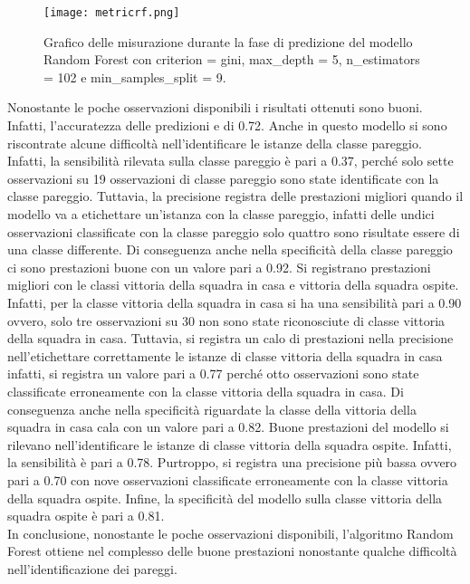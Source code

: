 \begin{figure}[]
	\begin{center}
		\texttt{[image: metricrf.png]}
		\caption{Grafico delle misurazione durante la fase di predizione del modello Random Forest con \textsf{criterion} = gini, \textsf{max\_depth} = 5, \textsf{n\_estimators} = 102 e \textsf{min\_samples\_split} = 9.
		} 
		\label{fig:rfmetrics}
	\end{center}
\end{figure}
Nonostante le poche osservazioni disponibili i risultati ottenuti sono buoni. Infatti, l'accuratezza delle predizioni e di 0.72. Anche in questo modello si sono riscontrate alcune difficoltà nell'identificare le istanze della classe pareggio. Infatti, la sensibilità rilevata sulla classe pareggio è pari a 0.37, perché solo sette osservazioni su 19 osservazioni di classe pareggio sono state identificate con la classe pareggio. Tuttavia, la precisione registra delle prestazioni migliori quando il modello va a etichettare un'istanza con la classe pareggio, infatti delle undici osservazioni classificate con la classe pareggio solo quattro sono risultate essere di una classe differente. Di conseguenza anche nella specificità della classe pareggio ci sono prestazioni buone con un valore pari a 0.92. Si registrano prestazioni migliori con le classi vittoria della squadra in casa e vittoria della squadra ospite. Infatti, per la classe vittoria della squadra in casa si ha una sensibilità pari a 0.90 ovvero, solo tre osservazioni su 30 non sono state riconosciute di classe vittoria della squadra in casa. Tuttavia, si registra un calo di prestazioni nella precisione nell'etichettare correttamente le istanze di classe vittoria della squadra in casa infatti, si registra un valore pari a 0.77 perché otto osservazioni sono state classificate erroneamente con la classe vittoria della squadra in casa. Di conseguenza anche nella specificità riguardate la classe della vittoria della squadra in casa cala con un valore pari a 0.82. Buone prestazioni del modello si rilevano nell'identificare le istanze di classe vittoria della squadra ospite. Infatti, la sensibilità è pari a 0.78. Purtroppo, si registra una precisione più bassa ovvero pari a 0.70 con nove osservazioni classificate erroneamente con la classe vittoria della squadra ospite. Infine, la specificità del modello sulla classe vittoria della squadra ospite è pari a 0.81.\\
In conclusione, nonostante le poche osservazioni disponibili, l'algoritmo Random Forest ottiene nel complesso delle buone prestazioni nonostante qualche difficoltà nell’identificazione dei pareggi.


